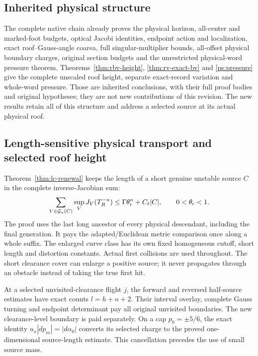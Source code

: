 \subsection*{Inherited physical structure}
The complete native chain already proves the physical horizon,
all-center and marked-foot budgets, optical Jacobi identities,
endpoint action and localization, exact roof--Gauss-angle coarea,
full singular-multiplier bounds, all-offset physical boundary
charges, original section budgets and the unrestricted physical-word
pressure theorem. Theorems~\ref{thm:rbv-height},
\ref{thm:rv-exact-bv} and \ref{ps:pressure} give the complete
unscaled roof height, separate exact-record variation and
whole-word pressure. Those are inherited conclusions, with their
full proof bodies and original hypotheses; they are not new
contributions of this revision. The new results retain all of this
structure and address a selected source at its actual physical roof.

\subsection*{Length-sensitive physical transport and selected roof height}
Theorem~\ref{thm:lc-renewal} keeps the length of a short genuine
unstable source $C$ in the complete inverse-Jacobian sum:
\[
 \sum_{V\in\mathcal G_n(C)}\sup_VJ_V(T_R^{-n})
       \le\Gamma\theta_{\rm r}^n+C_\ell|C|,
       \qquad 0<\theta_{\rm r}<1.
\]
The proof uses the last long ancestor of every physical descendant,
including the final generation. It pays the adapted/Euclidean
metric comparison once along a whole suffix. The enlarged curve
class has its own fixed homogeneous cutoff, short length and
distortion constants. Actual first collisions are used throughout.
The short clearance cover can enlarge a positive source; it never
propagates through an obstacle instead of taking the true first hit.

At a selected unvisited-clearance flight $j$, the forward and
reversed half-source estimates have exact counts
$l=h+n+2$. Their interval overlay, complete Gauss turning and
endpoint determinant pay all original unvisited boundaries.
The new clearance-level boundary is paid separately. On a cap
$p_0=\pm5/6$, the exact identity
$u_x|dp_m|=|d\alpha_0|$ converts its selected charge to the
proved one-dimensional source-length estimate. This cancellation
precedes the use of small source mass.

